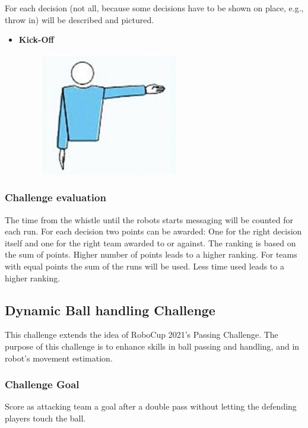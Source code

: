         For each decision (not all, because some decisions have to be shown on place, e.g., throw in) will be described and pictured.

        \begin{itemize}
            \item \textbf{Kick-Off}
            \begin{figure}[ht!]
                \includegraphics{figs/kick-off_referee.jpg}
            \end{figure}
        \end{itemize}

    \subsubsection{Challenge evaluation}
        The time from the whistle until the robots starts messaging will be counted for each run.
        For each decision two points can be awarded: One for the right decision itself and one for the right team awarded to or against.
        The ranking is based on the sum of points. Higher number of points leads to a higher ranking. For teams with equal points the sum of the runs will be used. Less time used leads to a higher ranking.


\subsection{Dynamic Ball handling Challenge}

    This challenge extends the idea of RoboCup 2021's Passing Challenge. The purpose of this challenge is to enhance skills in ball passing and handling, and in robot's movement estimation.

    \subsubsection{Challenge Goal}

        Score as attacking team a goal after a double pass without letting the defending players touch the ball.

